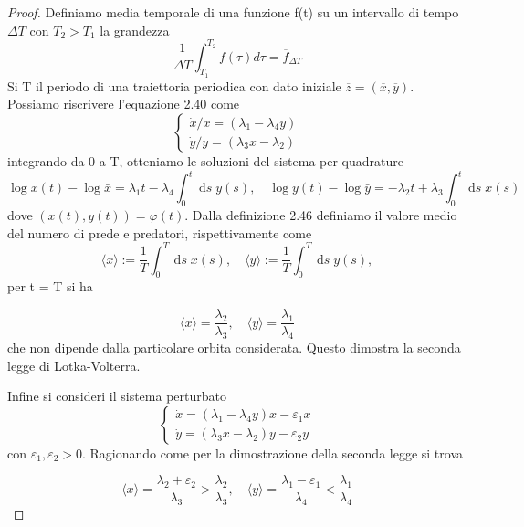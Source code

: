 \begin{proof}
	Definiamo media temporale di una funzione f(t) su un intervallo di tempo $\Delta T$ con $T_2 > T_1$ la grandezza
	\begin{equation}
		\frac{1}{\Delta T} \int_{T_1}^{T_2}f(\tau)d\tau = \overline{f}_{\Delta T}
	\end{equation}
Si T il periodo di una traiettoria periodica con dato iniziale $\overline{z} = (\overline{x},\overline{y})$. Possiamo riscrivere l'equazione 2.40 come 
\begin{equation*}
\left\{\begin{array}{l}
\dot{x} / x=(\lambda_1 - \lambda_4 y) \\
\dot{y} / y=(\lambda_3 x- \lambda_2)
\end{array}\right.
\end{equation*}
integrando da 0 a T, otteniamo le soluzioni del sistema per quadrature
\begin{equation*}
\log x(t)-\log \bar{x}=\lambda_1 t- \lambda_4 \int_0^t \mathrm{~d} s \; y(s), \quad \log y(t)-\log \bar{y}=-\lambda_2 t+ \lambda_3 \int_0^t \mathrm{~d} s \; x(s)
\end{equation*}
dove $(x(t),y(t)) = \varphi(t) $. Dalla definizione 2.46 definiamo il valore medio del numero di prede e predatori, rispettivamente come
\begin{equation*}
\langle x\rangle:=\frac{1}{T} \int_0^T \mathrm{~d} s \;x(s), \quad\langle y\rangle:=\frac{1}{T} \int_0^T \mathrm{~d} s \; y(s),
\end{equation*}
\newpage
per t = T si ha

\begin{equation*}
\langle x\rangle=\frac{\lambda_2}{\lambda_3}, \quad\langle y\rangle=\frac{\lambda_1}{\lambda_4}
\end{equation*}
che non dipende dalla particolare orbita considerata. Questo dimostra la seconda legge di Lotka-Volterra.

Infine si consideri il sistema perturbato 
\begin{equation}
\left\{\begin{array}{l}
\dot{x}=(\lambda_1-\lambda_4 y) x-\varepsilon_1 x \\
\dot{y}=(\lambda_3 x-\lambda_2) y-\varepsilon_2 y
\end{array}\right.
\end{equation}
con $\varepsilon_1,\varepsilon_2 > 0$. Ragionando come per la dimostrazione della seconda legge si trova
 
\begin{equation}
\langle x\rangle=\frac{\lambda_2 +\varepsilon_2}{\lambda_3}>\frac{\lambda_2}{\lambda_3}, \quad\langle y\rangle=\frac{\lambda_1 -\varepsilon_1}{\lambda_4}<\frac{\lambda_1}{\lambda_4}
\end{equation} 

\end{proof}


